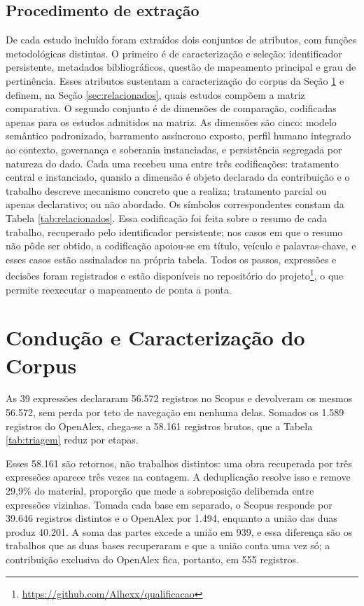 \subsection{Procedimento de extração}

De cada estudo incluído foram extraídos dois conjuntos de atributos, com funções metodológicas distintas. O primeiro é de caracterização e seleção: identificador persistente, metadados bibliográficos, questão de mapeamento principal e grau de pertinência. Esses atributos sustentam a caracterização do corpus da Seção \ref{sec:conducao} e definem, na Seção \ref{sec:relacionados}, quais estudos compõem a matriz comparativa. O segundo conjunto é de dimensões de comparação, codificadas apenas para os estudos admitidos na matriz. As dimensões são cinco: modelo semântico padronizado, barramento assíncrono exposto, perfil humano integrado ao contexto, governança e soberania instanciadas, e persistência segregada por natureza do dado. Cada uma recebeu uma entre três codificações: tratamento central e instanciado, quando a dimensão é objeto declarado da contribuição e o trabalho descreve mecanismo concreto que a realiza; tratamento parcial ou apenas declarativo; ou não abordado. Os símbolos correspondentes constam da Tabela \ref{tab:relacionados}. Essa codificação foi feita sobre o resumo de cada trabalho, recuperado pelo identificador persistente; nos casos em que o resumo não pôde ser obtido, a codificação apoiou-se em título, veículo e palavras-chave, e esses casos estão assinalados na própria tabela. Todos os passos, expressões e decisões foram registrados e estão disponíveis no repositório do projeto\footnote{\url{https://github.com/Alhexx/qualificacao}}, o que permite reexecutar o mapeamento de ponta a ponta.

\section{Condução e Caracterização do Corpus}
\label{sec:conducao}

As 39 expressões declararam 56.572 registros no Scopus e devolveram os mesmos 56.572, sem perda por teto de navegação em nenhuma delas. Somados os 1.589 registros do OpenAlex, chega-se a 58.161 registros brutos, que a Tabela \ref{tab:triagem} reduz por etapas.

Esses 58.161 são retornos, não trabalhos distintos: uma obra recuperada por três expressões aparece três vezes na contagem. A deduplicação resolve isso e remove 29,9\% do material, proporção que mede a sobreposição deliberada entre expressões vizinhas. Tomada cada base em separado, o Scopus responde por 39.646 registros distintos e o OpenAlex por 1.494, enquanto a união das duas produz 40.201. A soma das partes excede a união em 939, e essa diferença são os trabalhos que as duas bases recuperaram e que a união conta uma vez só; a contribuição exclusiva do OpenAlex fica, portanto, em 555 registros.

